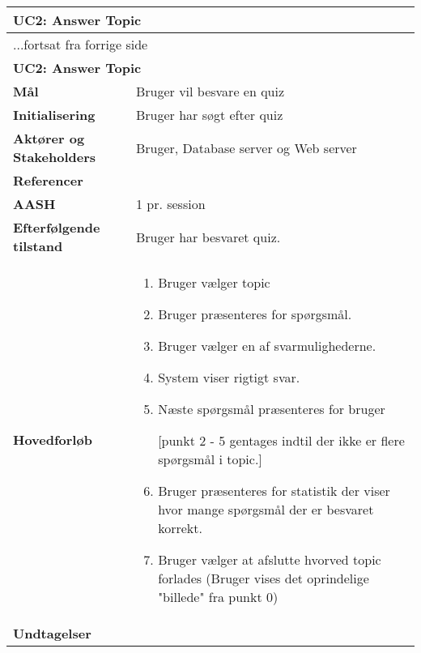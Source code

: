 \begin{center} \centering \label{ucAnswerTopic}
	\begin{longtable}{|p{4.6cm}|p{9.4cm}|}  %
		\hline
		\multicolumn{2}{|l|}{\textbf{UC2: Answer Topic}} \\\hline
		\endfirsthead
		
		\multicolumn{2}{l}{...fortsat fra forrige side} \\ \hline %
		\multicolumn{2}{|l|}{\textbf{UC2: Answer Topic}} \\\hline
		\endhead	
		
		\textbf{Mål}						&Bruger vil besvare en quiz
		\\\hline
		\textbf{Initialisering}			&Bruger har søgt efter quiz
		\\\hline
		\textbf{Aktører og Stakeholders}	&Bruger, Database server og Web server
		\\\hline 
		\textbf{Referencer}				&
		\\\hline
		\textbf{AASH}					&1 pr. session
		\\\hline
		\textbf{Efterfølgende tilstand}	&Bruger har besvaret quiz.
		\\\hline
		\textbf{Hovedforløb}					
			&\begin{enumerate}
			\item Bruger vælger topic
			\item Bruger præsenteres for spørgsmål.
			\item Bruger vælger en af svarmulighederne. 
			\item System viser rigtigt svar.
			\item Næste spørgsmål præsenteres for bruger 
			
			[punkt 2 - 5 gentages indtil der ikke er flere spørgsmål i topic.]
			\item Bruger præsenteres for statistik der viser hvor mange spørgsmål der er 	besvaret korrekt.
			\item Bruger vælger at afslutte hvorved topic forlades (Bruger vises det oprindelige "billede" fra punkt 0)


			\end{enumerate}\\\hline
		\textbf{Undtagelser}
			&			
			\\\hline
	\end{longtable} 
\end{center}